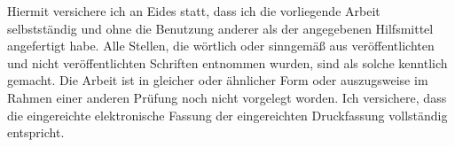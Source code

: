 \documentclass[12pt,a4paper,onecolumn,headheight=30pt]{scrartcl}
\begin{document}
Hiermit versichere ich an Eides statt, dass ich die vorliegende Arbeit selbstständig und ohne die Benutzung anderer als der angegebenen  Hilfsmittel angefertigt habe. Alle Stellen, die wörtlich oder sinngemäß  aus veröffentlichten und nicht veröffentlichten Schriften entnommen wurden,  sind als solche kenntlich gemacht. Die Arbeit ist in gleicher oder  ähnlicher Form oder  auszugsweise im Rahmen einer anderen Prüfung noch nicht vorgelegt worden. Ich versichere, dass die eingereichte  elektronische Fassung der eingereichten Druckfassung vollständig  entspricht.
\end{document}

